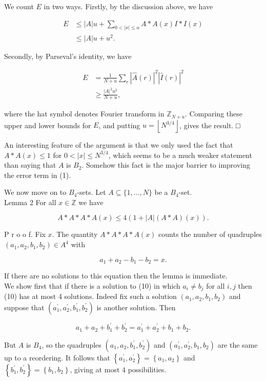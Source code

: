 \documentclass[10pt]{article}
\begin{document}
We count $E$ in two ways. Firstly, by the discussion above, we have

$$
\begin{aligned}
E & \leq|A| u+\sum_{0<|x| \leq u} A * A(x) I * I(x) \\
& \leq|A| u+u^{2} .
\end{aligned}
$$

Secondly, by Parseval's identity, we have

$$
\begin{aligned}
E & =\frac{1}{N+u} \sum_{r}|\hat{A}(r)|^{2}|\hat{I}(r)|^{2} \\
& \geq \frac{|A|^{2} u^{2}}{N+u},
\end{aligned}
$$

where the hat symbol denotes Fourier transform in $\mathbb{Z}_{N+u}$. Comparing these upper and lower bounds for $E$, and putting $u=\left\lfloor N^{3 / 4}\right\rfloor$, gives the result. □

An interesting feature of the argument is that we only used the fact that $A * A(x) \leq 1$ for $0<|x| \leq N^{3 / 4}$, which seems to be a much weaker statement than saying that $A$ is $B_{2}$. Somehow this fact is the major barrier to improving the error term in (1).

We now move on to $B_{4}$-sets. Let $A \subseteq\{1, \ldots, N\}$ be a $B_{4}$-set.\\
Lemma 2 For all $x \in \mathbb{Z}$ we have

$$
A * A * A * A(x) \leq 4(1+|A|(A * A)(x)) .
$$

P r o o f. Fix $x$. The quantity $A * A * A * A(x)$ counts the number of quadruples $\left(a_{1}, a_{2}, b_{1}, b_{2}\right) \in A^{4}$ with


\begin{equation*}
a_{1}+a_{2}-b_{1}-b_{2}=x . \tag{10}
\end{equation*}


If there are no solutions to this equation then the lemma is immediate.\\
We show first that if there is a solution to (10) in which $a_{i} \neq b_{j}$ for all $i, j$ then (10) has at most 4 solutions. Indeed fix such a solution $\left(a_{1}, a_{2}, b_{1}, b_{2}\right)$ and suppose that $\left(a_{1}^{\prime}, a_{2}^{\prime}, b_{1}^{\prime}, b_{2}^{\prime}\right)$ is another solution. Then

$$
a_{1}+a_{2}+b_{1}^{\prime}+b_{2}^{\prime}=a_{1}^{\prime}+a_{2}^{\prime}+b_{1}+b_{2} .
$$

But $A$ is $B_{4}$, so the quadruples $\left(a_{1}, a_{2}, b_{1}^{\prime}, b_{2}^{\prime}\right)$ and $\left(a_{1}^{\prime}, a_{2}^{\prime}, b_{1}, b_{2}\right)$ are the same up to a reordering. It follows that $\left\{a_{1}^{\prime}, a_{2}^{\prime}\right\}=\left\{a_{1}, a_{2}\right\}$ and $\left\{b_{1}^{\prime}, b_{2}^{\prime}\right\}=\left\{b_{1}, b_{2}\right\}$, giving at most 4 possibilities.
\end{document}
